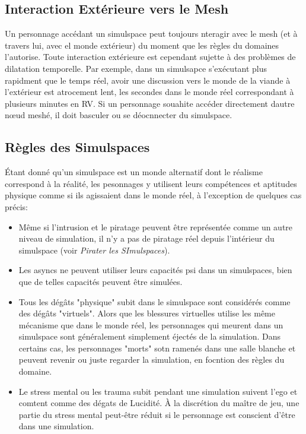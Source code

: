 \subsection{Interaction Extérieure vers le Mesh} 

Un personnage accédant un simulspace peut toujours nteragir avec le mesh (et à travers lui, avec el monde extérieur) du moment que les règles du domaines l'autorise. Toute interaction extérieure est cependant sujette à des problèmes de dilatation temporelle. Par exemple, dans un simulsapce s'exécutant plus rapidment que le temps réel, avoir une discussion vers le monde de la viande à l'extérieur est atrocement lent, les secondes dans le monde réel correspondant à plusieurs minutes en RV. Si un personnage souahite accéder directement dautre nœud meshé, il doit basculer ou se déocnnecter du simulspace. 

\subsection{Règles des Simulspaces} 

Étant donné qu'un simulspace est un monde alternatif dont le réalisme correspond à la réalité, les pesonnages y utilisent leurs compétences et aptitudes physique comme si ils agissaient dans le monde réel, à l'exception de quelques cas précis: \begin{itemize} \item Même si l'intrusion et le piratage peuvent être représentée comme un autre niveau de simulation, il n'y a pas de piratage réel depuis l'intérieur du simulspace (voir \textit{Pirater les SImulspaces}). 

\item Les asyncs ne peuvent utiliser leurs capacités psi dans un simulspaces, bien que de telles capacités peuvent être simulées. 

\item Tous les dégâts "physique" subit dans le simulspace sont considérés comme des dégâts "virtuels". Alors que les blessures virtuelles utilise les même mécanisme que dans le monde réel, les personnages qui meurent dans un simulspace sont généralement simplement éjectés de la simulation. Dans certains cas, les personnages "morts" sotn ramenés dans une salle blanche et peuvent revenir ou juste regarder la simulation, en focntion des règles du domaine. 

\item Le stress mental ou les trauma subit pendant une simulation suivent l'ego et comtent comme des dégats de Lucidité. À la discrétion du maître de jeu, une partie du stress mental peut-être réduit si le personnage est conscient d'être dans une simulation. \end{itemize} 



